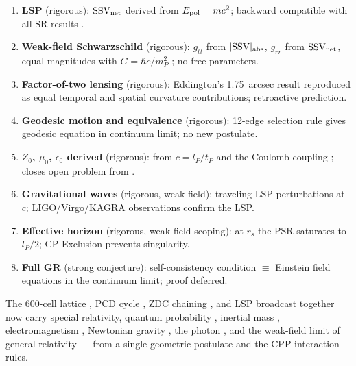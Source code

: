 \documentclass[12pt]{article}
\newcommand{\lP}{l_P}
\newcommand{\tP}{t_P}
\newcommand{\mP}{m_P}
\newcommand{\SSV}{\text{SSV}}
\begin{document}
\begin{enumerate}
  \item \textbf{LSP} \citep{abshier2026mass,abshier2026grav}
    (rigorous): $\mathbf{\SSV}_{\rm net}$ derived from
    $E_{\rm pol} = mc^2$; backward compatible with all SR results
    \citep{abshier2026sr}.

  \item \textbf{Weak-field Schwarzschild}
    \citep[Eq.~2]{einstein1915} (rigorous): $g_{tt}$ from
    $|\SSV|_{\rm abs}$, $g_{rr}$ from $\mathbf{\SSV}_{\rm net}$,
    equal magnitudes with $G = \hbar c/\mP^2$
    \citep{abshier2026grav}; no free parameters.

  \item \textbf{Factor-of-two lensing} \citep{eddington1920}
    (rigorous): Eddington's 1.75~arcsec result reproduced as equal
    temporal and spatial curvature contributions; retroactive
    prediction.

  \item \textbf{Geodesic motion and equivalence} (rigorous): 12-edge
    selection rule \citep{abshier2026am} gives geodesic equation in
    continuum limit; no new postulate.

  \item \textbf{$Z_0$, $\mu_0$, $\epsilon_0$ derived}
    \citep{codata2018} (rigorous): from $c = \lP/\tP$
    \citep{abshier2026am} and the Coulomb coupling
    \citep{abshier2026stiff}; closes open problem from
    \citet{abshier2026zdc}.

  \item \textbf{Gravitational waves} \citep{abbott2016}
    (rigorous, weak field): traveling LSP perturbations at $c$;
    LIGO/Virgo/KAGRA observations confirm the LSP.

  \item \textbf{Effective horizon} (rigorous, weak-field scoping):
    at $r_s$ the PSR \citep[Eq.~1]{abshier2026sr} saturates to
    $\lP/2$; CP Exclusion \citep{abshier2026am} prevents singularity.

  \item \textbf{Full GR} \citep{einstein1915} (strong conjecture):
    self-consistency condition $\equiv$ Einstein field equations in
    the continuum limit; proof deferred.
\end{enumerate}

The 600-cell lattice \citep{abshier2026sr}, PCD cycle
\citep{abshier2026am}, ZDC chaining \citep{abshier2026zdc}, and
LSP broadcast together now carry special relativity, quantum
probability \citep{abshier2026born}, inertial mass
\citep{abshier2026mass}, electromagnetism \citep{abshier2026stiff},
Newtonian gravity \citep{abshier2026grav}, the photon
\citep{abshier2026zdc}, and the weak-field limit of general relativity
--- from a single geometric postulate and the CPP interaction rules.
\end{document}
